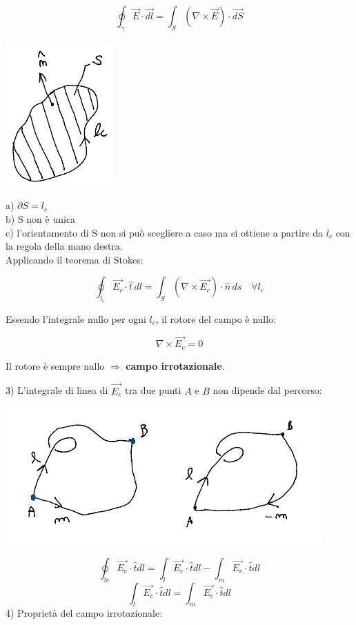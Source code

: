 \[
\oint_{\gamma} \vec{E} \cdot \vec{dl} = \int_S (\nabla \times \vec{E}) \cdot \vec{dS}
\]
\begin{center}
    \includegraphics{immagini/image8.png}
\end{center}
a) $\partial S = l_c$\\
b) S non è unica\\
c) l'orientamento di S non si può scegliere a caso ma si ottiene a partire da $l_c$ con la regola della mano destra.\\

Applicando il teorema di Stokes:

\[
\oint_{l_c} \vec{E_c} \cdot \hat{t}\,dl = \int_S (\nabla \times \vec{E_c}) \cdot \hat{n}\,ds \quad \forall l_c
\]

Essendo l'integrale nullo per ogni $l_c$, il rotore del campo è nullo:

\[
\nabla \times \vec{E_c} = 0
\]

Il rotore è sempre nullo $\Rightarrow$ \textbf{campo irrotazionale}.

3) L'integrale di linea di $\vec{E_c}$ tra due punti $A$ e $B$ non dipende dal percorso:
\begin{center}
    \includegraphics{immagini/image9.png}
\end{center}
\[
    \oint_{lc} \vec{E_c} \cdot \hat{t}dl = \int_{l} \vec{E_c} \cdot \hat{t}dl - \int_{m} \vec{E_c} \cdot \hat{t}dl
\]
\[
    \int_{l} \vec{E_c} \cdot \hat{t}dl = \int_{m} \vec{E_c} \cdot \hat{t}dl
\]
4) Proprietà del campo irrotazionale:

